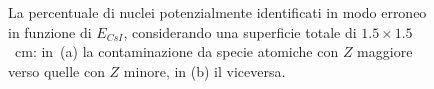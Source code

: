 \begin{figure}[!p] 
	\centering
	\hspace{10mm}
	\caption{La percentuale di nuclei potenzialmente identificati in modo erroneo in funzione di $E_{CsI}$, considerando una superficie totale di $1.5 \times 1.5$~cm: in~(a) la contaminazione da specie atomiche con $Z$ maggiore verso quelle con $Z$ minore, in (b) il viceversa.} \label{fig:leakage_res_1.5}
\end{figure}






